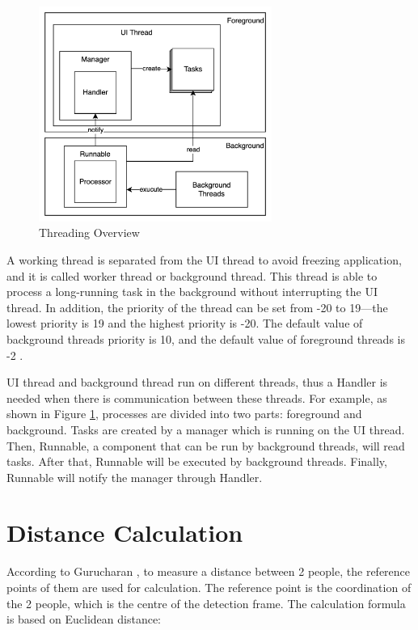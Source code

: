         \begin{figure}[!ht]
            \centering
            \includegraphics[width=3in]{images/chapter2/thread-overview.png}
            \caption{Threading Overview}
            \label{thread-overview}
        \end{figure}

        A working thread is separated from the UI thread to avoid freezing application,
            and it is called worker thread or background thread.
            This thread is able to process a long-running task in the background without interrupting the UI thread.
        In addition, the priority of the thread can be set from -20 to 19---the lowest priority is 19 and the highest priority is -20.
            The default value of background threads priority is 10,
            and the default value of foreground threads is -2 \cite{ANDROID-02}.

        UI thread and background thread run on different threads,
        thus a Handler is needed when there is communication between these threads.
        For example, as shown in Figure \ref{thread-overview},
        processes are divided into two parts: foreground and background.
        Tasks are created by a manager which is running on the UI thread.
        Then, Runnable, a component that can be run by background threads, will read tasks.
        After that, Runnable will be executed by background threads.
        Finally, Runnable will notify the manager through Handler.

    \section{Distance Calculation}\label{sectionDistanceCalculation}
        According to Gurucharan \cite{SOCIAL-DISTANCING-DETECTION}, to measure a distance between 2 people, the reference points of them are used for calculation.
        The reference point is the coordination of the 2 people, which is the centre of the detection frame.
        The calculation formula is based on Euclidean distance:


